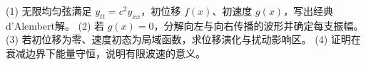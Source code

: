 (1) 无限均匀弦满足 \(y_{tt}=c^2y_{xx}\)，初位移 \(f(x)\)、初速度 \(g(x)\)，写出经典d'Alembert解。
(2) 若 \(g(x)=0\)，分解向左与向右传播的波形并确定每支振幅。
(3) 若初位移为零、速度初态为局域函数，求位移演化与扰动影响区。
(4) 证明在衰减边界下能量守恒，说明有限波速的意义。
